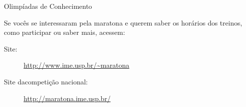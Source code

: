 \begin{subsecao}{Olimpíadas de Conhecimento}
\begin{itemize}
Se vocês se interessaram pela maratona e querem saber os horários dos
treinos, como participar ou saber mais, acessem:

\begin{description}
  \item[Site:] \url{http://www.ime.usp.br/~maratona}
  \item[Site dacompetição nacional:] \url{http://maratona.ime.usp.br/}
\end{description}

\end{itemize}


\end{subsecao}
